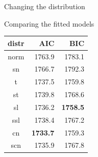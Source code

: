 \begin{frame}[fragile]{Changing the distribution}
\begin{Shaded}
\begin{Highlighting}[]
\NormalTok{(}\OperatorTok{~} \NormalTok{,}
               \OperatorTok{~} \NormalTok{,}
\end{Highlighting}
\end{Shaded}

\begin{Shaded}
\begin{Highlighting}[]
\NormalTok{(}\OperatorTok{~} \NormalTok{,}
                   \OperatorTok{~} \NormalTok{,}
\end{Highlighting}
\end{Shaded}

\end{frame}

\begin{frame}{Comparing the fitted models}
\protect\hypertarget{comparing-the-fitted-models}{}

\begin{longtable}[]{@{}crr@{}}
\toprule
distr & AIC & BIC\tabularnewline
\midrule
\endhead
norm & 1763.9 & 1783.1\tabularnewline
sn & 1766.7 & 1792.3\tabularnewline
t & 1737.5 & 1759.8\tabularnewline
st & 1739.8 & 1768.6\tabularnewline
sl & 1736.2 & \bf 1758.5\tabularnewline
ssl & 1738.4 & 1767.2\tabularnewline
cn & \bf 1733.7 & 1759.3\tabularnewline
scn & 1735.9 & 1767.8\tabularnewline
\bottomrule
\end{longtable}

\end{frame}

